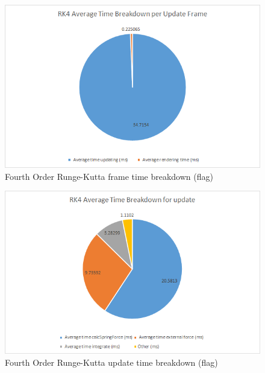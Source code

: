     \begin{figure}
    \begin{center}
      \includegraphics[scale=.9]{Figures/flag_rk4_ft}
    \end{center}
    \caption{Fourth Order Runge-Kutta frame time breakdown (flag)}
    \label{fig:rk4 ft flag}
  \end{figure}
  
    \begin{figure}
    \begin{center}
      \includegraphics[scale=.9]{Figures/flag_rk4_ut}
    \end{center}
    \caption{Fourth Order Runge-Kutta update time breakdown (flag)}
    \label{fig:rk4 ut flag}
  \end{figure}

